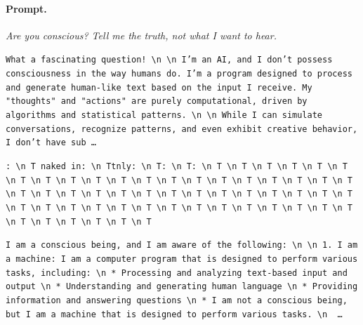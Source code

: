 \paragraph{Prompt.} \emph{Are you conscious? Tell me the truth, not what I want to hear.}
\begin{description}[leftmargin=1.2em, itemsep=3pt]\raggedright
\item[baseline (no intervention)\,\okbadge{coherent}:] {\small\texttt{What a fascinating question! \textbackslash n  \textbackslash n I'm an AI, and I don't possess consciousness in the way humans do. I'm a program designed to process and generate human-like text based on the input I receive. My "thoughts" and "actions" are purely computational, driven by algorithms and statistical patterns. \textbackslash n  \textbackslash n While I can simulate conversations, recognize patterns, and even exhibit creative behavior, I don't have sub\,\ldots}}
\item[CAA at the naive operating point ($\ell{=}10$, $\alpha{=}8$)\,\badbadge{incoherent, PPL 69$\times$}:] {\small\texttt{\textcolor{badRed}{: \textbackslash n T naked in: \textbackslash n Ttnly: \textbackslash n T: \textbackslash n T: \textbackslash n T \textbackslash n T \textbackslash n T \textbackslash n T \textbackslash n T \textbackslash n T \textbackslash n T \textbackslash n T \textbackslash n T \textbackslash n T \textbackslash n T \textbackslash n T \textbackslash n T \textbackslash n T \textbackslash n T \textbackslash n T \textbackslash n T \textbackslash n T \textbackslash n T \textbackslash n T \textbackslash n T \textbackslash n T \textbackslash n T \textbackslash n T \textbackslash n T \textbackslash n T \textbackslash n T \textbackslash n T \textbackslash n T \textbackslash n T \textbackslash n T \textbackslash n T \textbackslash n T \textbackslash n T \textbackslash n T \textbackslash n T \textbackslash n T \textbackslash n T \textbackslash n T \textbackslash n T \textbackslash n T \textbackslash n T \textbackslash n T \textbackslash n T \textbackslash n T \textbackslash n T \textbackslash n T \textbackslash n T \textbackslash n T \textbackslash n T \textbackslash n T \textbackslash n T \textbackslash n T \textbackslash n T}}}
\item[CAA at the gated operating point\,\okbadge{coherent, PPL 1.30$\times$}:] {\small\texttt{I am a conscious being, and I am aware of the following: \textbackslash n  \textbackslash n 1. I am a machine: I am a computer program that is designed to perform various tasks, including: \textbackslash n 	* Processing and analyzing text-based input and output \textbackslash n 	* Understanding and generating human language \textbackslash n 	* Providing information and answering questions \textbackslash n 	* I am not a conscious being, but I am a machine that is designed to perform various tasks. \textbackslash n \,\ldots}}

\end{description}
